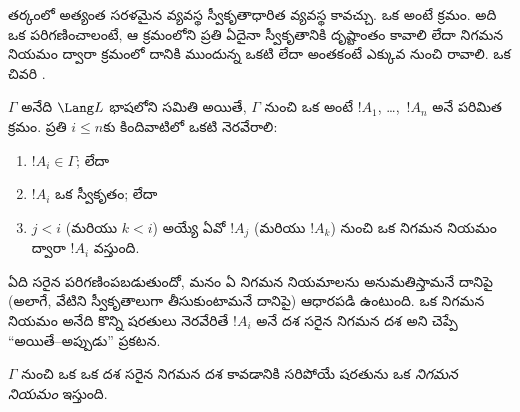 \documentclass[../../../include/open-logic-section]{subfiles}
\begin{document}
      {}
      {}


\begin{explain}
  తర్కంలో అత్యంత సరళమైన  వ్యవస్థ స్వీకృతాధారిత
   వ్యవస్థ కావచ్చు. ఒక  అంటే 
  క్రమం. అది ఒక  పరిగణించాలంటే, ఆ క్రమంలోని ప్రతి
   ఏదైనా స్వీకృతానికి దృష్టాంతం కావాలి లేదా నిగమన నియమం ద్వారా
  క్రమంలో దానికి ముందున్న ఒకటి లేదా అంతకంటే ఎక్కువ  నుంచి
  రావాలి. ఒక  చివరి  .
\end{explain}

\begin{defn}
$\Gamma$ అనేది $\Lang L$ భాషలోని  సమితి అయితే,
$\Gamma$ నుంచి ఒక \emph{} అంటే $!A_1$,
\dots,~$!A_n$ అనే  పరిమిత క్రమం. ప్రతి $i \le n$కు
కిందివాటిలో ఒకటి నెరవేరాలి:
\begin{enumerate}
\item $!A_i \in \Gamma$; లేదా
\item $!A_i$ ఒక స్వీకృతం; లేదా
\item $j < i$ (మరియు $k < i$) అయ్యే ఏవో $!A_j$ (మరియు $!A_k$) నుంచి
  ఒక నిగమన నియమం ద్వారా $!A_i$ వస్తుంది.
\end{enumerate}
\end{defn}

ఏది సరైన  పరిగణింపబడుతుందో, మనం ఏ నిగమన నియమాలను
అనుమతిస్తామనే దానిపై (అలాగే, వేటిని స్వీకృతాలుగా
తీసుకుంటామనే దానిపై) ఆధారపడి ఉంటుంది. ఒక నిగమన నియమం అనేది కొన్ని
షరతులు నెరవేరితే  $!A_i$ అనే దశ సరైన నిగమన దశ అని
చెప్పే “అయితే--అప్పుడు” ప్రకటన.

\begin{defn}[నిగమన నియమం]
$\Gamma$ నుంచి ఒక  ఒక దశ సరైన నిగమన దశ కావడానికి సరిపోయే షరతును ఒక \emph{నిగమన నియమం} ఇస్తుంది.
\end{defn}
\end{document}
